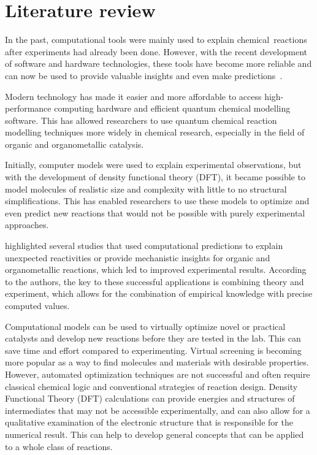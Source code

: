 \chapter{Literature review}%
\label{ch:lit-review}

In the past,
computational tools were mainly used to explain chemical~reactions after experiments had already been done.
However,
with the recent development of software and hardware technologies,
these tools have become more reliable and can now be used to provide valuable insights and even make predictions~\cite{Ahn_2019}.

Modern technology has made it easier and more affordable to access high-performance computing hardware and efficient quantum chemical modelling software.
This has allowed researchers to use quantum chemical reaction modelling techniques more widely in chemical research,
especially in the field of organic and organometallic catalysis.

Initially,
computer models were used to explain experimental observations,
but with the development of density functional theory (DFT),
it became possible to model molecules of realistic size and complexity with little to no structural simplifications.
This has enabled researchers to use these models to optimize and even predict new reactions that would not be possible with purely experimental approaches.

\citeauthor{Ahn_2019} highlighted several studies that used computational predictions to explain unexpected reactivities or provide mechanistic insights for organic and organometallic reactions,
which led to improved experimental results.
According to the authors,
the key to these successful applications is combining theory and experiment,
which allows for the combination of empirical knowledge with precise computed values\cite{Ahn_2019}.

Computational models can be used to virtually optimize novel or practical catalysts and develop new reactions before they are tested in the lab.
This can save time and effort compared to experimenting.
Virtual screening is becoming more popular as a way to find molecules and materials with desirable properties.
However,
automated optimization techniques are not successful and often require classical chemical logic and conventional strategies of reaction design.
Density Functional Theory (DFT) calculations can provide energies and structures of intermediates that may not be accessible experimentally,
and can also allow for a qualitative examination of the electronic structure that is responsible for the numerical result.
This can help to develop general concepts that can be applied to a whole class of reactions.


